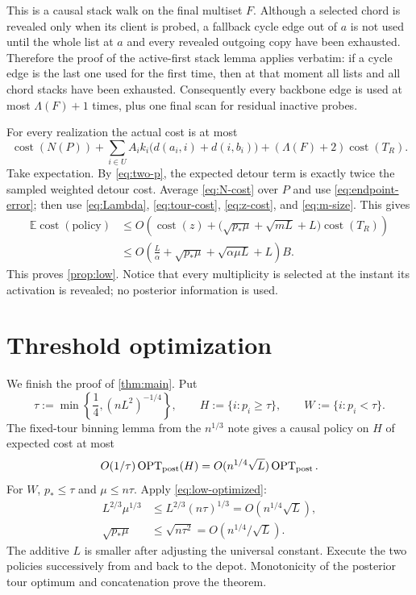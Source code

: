 \documentclass[11pt]{article}
\theoremstyle{remark}
\newcommand{\E}{\mathbb E}
\newcommand{\opt}{\operatorname{OPT}}
\newcommand{\cost}{\operatorname{cost}}
\begin{document}
This is a causal stack walk on the final multiset $F$.  Although a selected
chord is revealed only when its client is probed, a fallback cycle edge out of
$a$ is not used until the whole list at $a$ and every revealed outgoing copy
have been exhausted.  Therefore the proof of the active-first stack lemma
applies verbatim: if a cycle edge is the last one used for the first time,
then at that moment all lists and all chord stacks have been exhausted.
Consequently every backbone edge is used at most $\Lambda(F)+1$ times, plus
one final scan for residual inactive probes.

For every realization the actual cost is at most
\begin{equation}\label{eq:virtual-cost}
 \cost(N(P))+
 \sum_{i\in U}A_i k_i
       \bigl(d(a_i,i)+d(i,b_i)\bigr)
 +(\Lambda(F)+2)\cost(T_R).
\end{equation}
Take expectation.  By \eqref{eq:two-p}, the expected detour term is exactly
twice the sampled weighted detour cost.  Average \eqref{eq:N-cost} over $P$
and use \eqref{eq:endpoint-error}; then use
\eqref{eq:Lambda}, \eqref{eq:tour-cost}, \eqref{eq:z-cost}, and
\eqref{eq:m-size}.  This gives
\begin{align*}
 \E\cost(\text{policy})
 &\le O\left(\cost(z)+
   \bigl(\sqrt{p_*\mu}+\sqrt{mL}+L\bigr)\cost(T_R)\right)\\
 &\le O\left(\frac L\alpha+\sqrt{p_*\mu}
   +\sqrt{\alpha\mu L}+L\right)B.
\end{align*}
This proves \cref{prop:low}.  Notice that every multiplicity is selected at
the instant its activation is revealed; no posterior information is used.

\section{Threshold optimization}

We finish the proof of \cref{thm:main}.  Put
\[
 \tau:=\min\left\{\frac14,(nL^2)^{-1/4}\right\},
 \qquad
 H:=\{i:p_i\ge\tau\},
 \qquad
 W:=\{i:p_i<\tau\}.
\]
The fixed-tour binning lemma from the $n^{1/3}$ note gives a causal policy on
$H$ of expected cost at most
\[
 O(1/\tau)\opt_{\rm post}(H)
 =O(n^{1/4}\sqrt L)\opt_{\rm post}.
\]
For $W$, $p_*\le\tau$ and $\mu\le n\tau$.  Apply
\eqref{eq:low-optimized}:
\begin{align*}
 L^{2/3}\mu^{1/3}
 &\le L^{2/3}(n\tau)^{1/3}
 =O(n^{1/4}\sqrt L),\\
 \sqrt{p_*\mu}
 &\le\sqrt{n\tau^2}
 =O(n^{1/4}/\sqrt L).
\end{align*}
The additive $L$ is smaller after adjusting the universal constant.  Execute
the two policies successively from and back to the depot.  Monotonicity of
the posterior tour optimum and concatenation prove the theorem.
\end{document}
